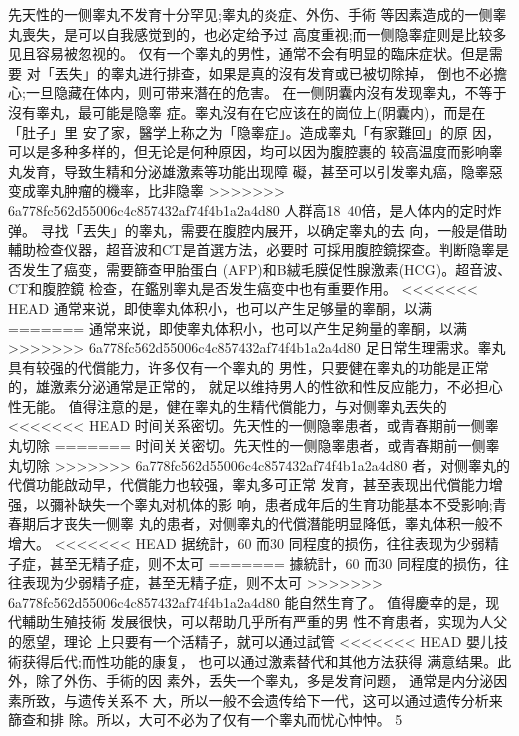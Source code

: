 \documentclass[12pt,UTF8]{ctexbook}
\begin{document}
先天性的一侧睾丸不发育十分罕见;睾丸的炎症、外伤、手術
等因素造成的一侧睾丸喪失，是可以自我感觉到的，也必定给予过
高度重视;而一侧隐睾症则是比较多见且容易被忽视的。
仅有一个睾丸的男性，通常不会有明显的臨床症状。但是需要
对「丟失」的睾丸进行排查，如果是真的沒有发育或已被切除掉，
倒也不必擔心;一旦隐藏在体内，则可带来潛在的危害。
在一侧阴囊内沒有发现睾丸，不等于沒有睾丸，最可能是隐睾
症。睾丸沒有在它应该在的崗位上(阴囊内)，而是在「肚子」里
安了家，醫学上称之为「隐睾症」。造成睾丸「有家難回」的原
因，可以是多种多样的，但无论是何种原因，均可以因为腹腔裹的
较高温度而影响睾丸发育，导致生精和分泌雄激素等功能出现障
礙，甚至可以引发睾丸癌，隐睾惡变成睾丸肿瘤的機率，比非隐睾
>>>>>>> 6a778fc562d55006c4c857432af74f4b1a2a4d80
人群高18~40倍，是人体内的定时炸弹。
寻找「丟失」的睾丸，需要在腹腔内展开，以确定睾丸的去
向，一般是借助輔助检查仪器，超音波和CT是首選方法，必要时
可採用腹腔鏡探查。判断隐睾是否发生了癌变，需要篩查甲胎蛋白
(AFP)和B絨毛膜促性腺激素(HCG)。超音波、CT和腹腔鏡
检查，在鑑別睾丸是否发生癌变中也有重要作用。
<<<<<<< HEAD
通常来说，即使睾丸体积小，也可以产生足够量的睾酮，以满
=======
通常来说，即使睾丸体积小，也可以产生足夠量的睾酮，以满
>>>>>>> 6a778fc562d55006c4c857432af74f4b1a2a4d80
足日常生理需求。睾丸具有较强的代償能力，许多仅有一个睾丸的
男性，只要健在睾丸的功能是正常的，雄激素分泌通常是正常的，
就足以维持男人的性欲和性反应能力，不必担心性无能。
值得注意的是，健在睾丸的生精代償能力，与对侧睾丸丟失的
<<<<<<< HEAD
时间关系密切。先天性的一侧隐睾患者，或青春期前一侧睾丸切除
=======
时间关关密切。先天性的一侧隐睾患者，或青春期前一侧睾丸切除
>>>>>>> 6a778fc562d55006c4c857432af74f4b1a2a4d80
者，对侧睾丸的代償功能啟动早，代償能力也较强，睾丸多可正常
发育，甚至表现出代償能力增强，以彌补缺失一个睾丸对机体的影
响，患者成年后的生育功能基本不受影响;青春期后才丧失一侧睾
丸的患者，对侧睾丸的代償潛能明显降低，睾丸体积一般不增大。
<<<<<<< HEAD
据统計，60%
而30%
同程度的损伤，往往表现为少弱精子症，甚至无精子症，则不太可
=======
據統計，60%
而30%
同程度的损伤，往往表现为少弱精子症，甚至无精子症，则不太可
>>>>>>> 6a778fc562d55006c4c857432af74f4b1a2a4d80
能自然生育了。
值得慶幸的是，现代輔助生殖技術
发展很快，可以帮助几乎所有严重的男
性不育患者，实现为人父的愿望，理论
上只要有一个活精子，就可以通过試管
<<<<<<< HEAD
嬰儿技術获得后代;而性功能的康复，
也可以通过激素替代和其他方法获得
满意结果。此外，除了外伤、手術的因
素外，丢失一个睾丸，多是发育问题，
通常是内分泌因素所致，与遗传关系不
大，所以一般不会遗传给下一代，这可以通过遗传分析来篩查和排
除。所以，大可不必为了仅有一个睾丸而忧心忡忡。
5
\end{document}
